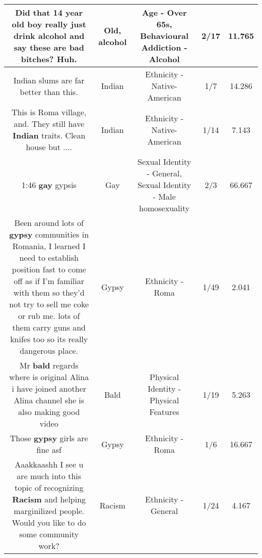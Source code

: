 \documentclass[11pt]{article}
\newlength\mylength
\begin{document}
\begin{center}
\begin{longtable}{|C{.65\mylength}|C{.30\mylength}|C{.12\mylength}|C{.12\mylength}|C{.12\mylength}|}
  \small Did that 14 year \textbf{old} boy really just drink \textbf{alcohol} and say these are bad bitches? Huh.\normalsize   & Old, alcohol & Age - Over 65s, Behavioural Addiction - Alcohol & 2/17 & 11.765 \\  \hline
  \small Indian slums are far better than this.\normalsize   & Indian & Ethnicity - Native-American & 1/7 & 14.286 \\  \hline
  \small This is Roma village, and. They still have \textbf{Indian} traits. Clean house but ....\normalsize   & Indian & Ethnicity - Native-American & 1/14 & 7.143 \\  \hline
  \small 1:46 \textbf{g\textbf{ay}} gypsis\normalsize   & Gay & Sexual Identity - General, Sexual Identity - Male homosexuality & 2/3 & 66.667 \\  \hline
  \small Been around lots of \textbf{gypsy} communities in Romania, I learned I need to establish position fast to come off as if I'm familiar with them so they'd not try to sell me coke or rub me.  lots of them carry guns and knifes too so its really dangerous place.\normalsize   & Gypsy & Ethnicity - Roma & 1/49 & 2.041 \\  \hline
  \small Mr \textbf{bald} regards where is original Alina  i have joined another Alina channel she is also making good video\normalsize   & Bald & Physical Identity - Physical Features & 1/19 & 5.263 \\  \hline
  \small Those \textbf{gypsy} girls are fine asf\normalsize   & Gypsy & Ethnicity - Roma & 1/6 & 16.667 \\  \hline
  \small Aaakkaashh I see u are much into this topic of recognizing \textbf{Racism} and helping marginilized people. Would you like to do some community work?\normalsize   & Racism & Ethnicity - General & 1/24 & 4.167 \\  \hline

\end{longtable}
\end{center}
\end{document}
